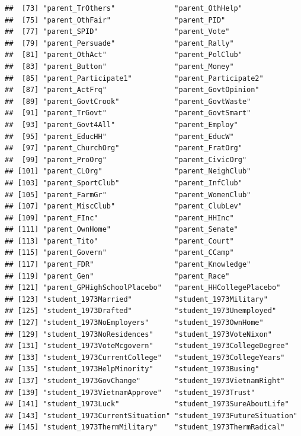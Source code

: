 \documentclass[
]{article}
\begin{document}
\begin{verbatim}
##  [73] "parent_TrOthers"              "parent_OthHelp"              
##  [75] "parent_OthFair"               "parent_PID"                  
##  [77] "parent_SPID"                  "parent_Vote"                 
##  [79] "parent_Persuade"              "parent_Rally"                
##  [81] "parent_OthAct"                "parent_PolClub"              
##  [83] "parent_Button"                "parent_Money"                
##  [85] "parent_Participate1"          "parent_Participate2"         
##  [87] "parent_ActFrq"                "parent_GovtOpinion"          
##  [89] "parent_GovtCrook"             "parent_GovtWaste"            
##  [91] "parent_TrGovt"                "parent_GovtSmart"            
##  [93] "parent_Govt4All"              "parent_Employ"               
##  [95] "parent_EducHH"                "parent_EducW"                
##  [97] "parent_ChurchOrg"             "parent_FratOrg"              
##  [99] "parent_ProOrg"                "parent_CivicOrg"             
## [101] "parent_CLOrg"                 "parent_NeighClub"            
## [103] "parent_SportClub"             "parent_InfClub"              
## [105] "parent_FarmGr"                "parent_WomenClub"            
## [107] "parent_MiscClub"              "parent_ClubLev"              
## [109] "parent_FInc"                  "parent_HHInc"                
## [111] "parent_OwnHome"               "parent_Senate"               
## [113] "parent_Tito"                  "parent_Court"                
## [115] "parent_Govern"                "parent_CCamp"                
## [117] "parent_FDR"                   "parent_Knowledge"            
## [119] "parent_Gen"                   "parent_Race"                 
## [121] "parent_GPHighSchoolPlacebo"   "parent_HHCollegePlacebo"     
## [123] "student_1973Married"          "student_1973Military"        
## [125] "student_1973Drafted"          "student_1973Unemployed"      
## [127] "student_1973NoEmployers"      "student_1973OwnHome"         
## [129] "student_1973NoResidences"     "student_1973VoteNixon"       
## [131] "student_1973VoteMcgovern"     "student_1973CollegeDegree"   
## [133] "student_1973CurrentCollege"   "student_1973CollegeYears"    
## [135] "student_1973HelpMinority"     "student_1973Busing"          
## [137] "student_1973GovChange"        "student_1973VietnamRight"    
## [139] "student_1973VietnamApprove"   "student_1973Trust"           
## [141] "student_1973Luck"             "student_1973SureAboutLife"   
## [143] "student_1973CurrentSituation" "student_1973FutureSituation" 
## [145] "student_1973ThermMilitary"    "student_1973ThermRadical"    

\end{verbatim}
\end{document}
